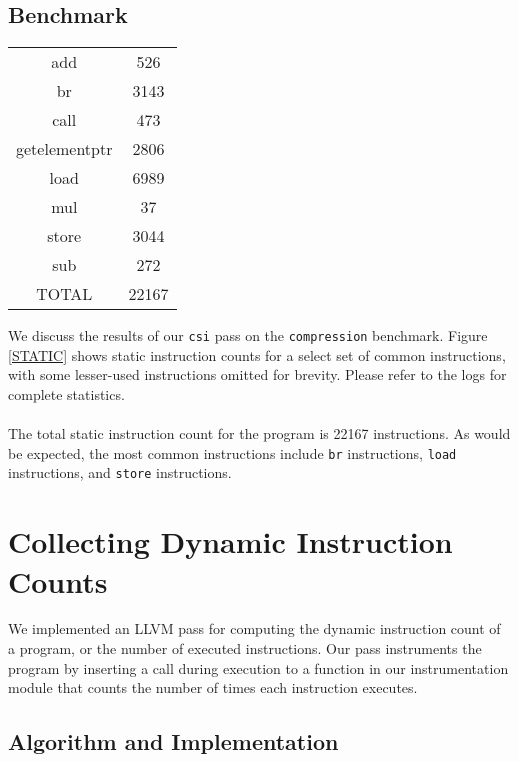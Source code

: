 \documentclass[12pt]{article}
\begin{document}
\subsection{Benchmark}

\begin{figure*}[!t]
\begin{center}
\begin{tabular} { |c|c| }
\hline
	add & 526 \\
	br & 3143 \\
	call & 473 \\
	getelementptr & 2806 \\
	load & 6989 \\
	mul & 37 \\
	store & 3044 \\
	sub & 272 \\
	TOTAL & 22167 \\
\hline
\end{tabular}
\caption{Selected static instruction counts from the {\tt compression} benchmark}
\label{STATIC}
\end{center}
\end{figure*}

We discuss the results of our {\tt csi} pass on the {\tt compression} benchmark. Figure \ref{STATIC} shows static instruction counts for a select set of common instructions, with some lesser-used instructions omitted for brevity. Please refer to the logs for complete statistics.
\\\\
The total static instruction count for the program is 22167 instructions. As would be expected, the most common instructions include {\tt br} instructions, {\tt load} instructions, and {\tt store} instructions. 


\section{Collecting Dynamic Instruction Counts}

We implemented an LLVM pass for computing the dynamic instruction count of a program, or the number of executed instructions. Our pass instruments the program by inserting a call during execution to a function in our instrumentation module that counts the number of times each instruction executes. 

\subsection{Algorithm and Implementation}
\end{document}
